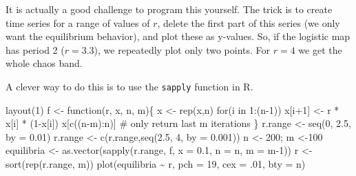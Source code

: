 \documentclass[
  a4paper,
  DIV=11,
  numbers=noendperiod,
  oneside]{scrreprt}
\newenvironment{Shaded}{}{}
\newcommand{\AttributeTok}[1]{\textcolor[rgb]{0.84,0.23,0.29}{#1}}
\newcommand{\CommentTok}[1]{\textcolor[rgb]{0.42,0.45,0.49}{#1}}
\newcommand{\ControlFlowTok}[1]{\textcolor[rgb]{0.84,0.23,0.29}{#1}}
\newcommand{\DecValTok}[1]{\textcolor[rgb]{0.00,0.36,0.77}{#1}}
\newcommand{\FloatTok}[1]{\textcolor[rgb]{0.00,0.36,0.77}{#1}}
\newcommand{\FunctionTok}[1]{\textcolor[rgb]{0.44,0.26,0.76}{#1}}
\newcommand{\NormalTok}[1]{\textcolor[rgb]{0.14,0.16,0.18}{#1}}
\newcommand{\OtherTok}[1]{\textcolor[rgb]{0.44,0.26,0.76}{#1}}
\newcommand{\SpecialCharTok}[1]{\textcolor[rgb]{0.00,0.36,0.77}{#1}}
\newcommand{\StringTok}[1]{\textcolor[rgb]{0.01,0.18,0.38}{#1}}
\begin{document}
It is actually a good challenge to program this yourself. The trick is
to create time series for a range of values of \(r\), delete the first
part of this series (we only want the equilibrium behavior), and plot
these as y-values. So, if the logistic map has period 2 (\(r = 3.3\)),
we repeatedly plot only two points. For \(r = 4\) we get the whole chaos
band.

A clever way to do this is to use the \texttt{sapply} function in R.

\begin{Shaded}
\begin{Highlighting}[]
\FunctionTok{layout}\NormalTok{(}\DecValTok{1}\NormalTok{)}
\NormalTok{f }\OtherTok{\textless{}{-}} \ControlFlowTok{function}\NormalTok{(r, x, n, m)\{}
\NormalTok{  x }\OtherTok{\textless{}{-}} \FunctionTok{rep}\NormalTok{(x,n)}
  \ControlFlowTok{for}\NormalTok{(i }\ControlFlowTok{in} \DecValTok{1}\SpecialCharTok{:}\NormalTok{(n}\DecValTok{{-}1}\NormalTok{)) x[i}\SpecialCharTok{+}\DecValTok{1}\NormalTok{] }\OtherTok{\textless{}{-}}\NormalTok{ r }\SpecialCharTok{*}\NormalTok{ x[i] }\SpecialCharTok{*}\NormalTok{ (}\DecValTok{1}\SpecialCharTok{{-}}\NormalTok{x[i])}
\NormalTok{  x[}\FunctionTok{c}\NormalTok{((n}\SpecialCharTok{{-}}\NormalTok{m)}\SpecialCharTok{:}\NormalTok{n)] }\CommentTok{\# only return last m iterations}
\NormalTok{\}}
\NormalTok{r.range }\OtherTok{\textless{}{-}} \FunctionTok{seq}\NormalTok{(}\DecValTok{0}\NormalTok{, }\FloatTok{2.5}\NormalTok{, }\AttributeTok{by =} \FloatTok{0.01}\NormalTok{) }
\NormalTok{r.range }\OtherTok{\textless{}{-}} \FunctionTok{c}\NormalTok{(r.range,}\FunctionTok{seq}\NormalTok{(}\FloatTok{2.5}\NormalTok{, }\DecValTok{4}\NormalTok{, }\AttributeTok{by =} \FloatTok{0.001}\NormalTok{)) }
\NormalTok{n }\OtherTok{\textless{}{-}} \DecValTok{200}\NormalTok{; m }\OtherTok{\textless{}{-}}\DecValTok{100} 
\NormalTok{equilibria }\OtherTok{\textless{}{-}} \FunctionTok{as.vector}\NormalTok{(}\FunctionTok{sapply}\NormalTok{(r.range, f,  }\AttributeTok{x =} \FloatTok{0.1}\NormalTok{, }\AttributeTok{n =}\NormalTok{ n, }\AttributeTok{m =}\NormalTok{ m}\DecValTok{{-}1}\NormalTok{))}
\NormalTok{r }\OtherTok{\textless{}{-}} \FunctionTok{sort}\NormalTok{(}\FunctionTok{rep}\NormalTok{(r.range, m))}
\FunctionTok{plot}\NormalTok{(equilibria }\SpecialCharTok{\textasciitilde{}}\NormalTok{ r, }\AttributeTok{pch =} \DecValTok{19}\NormalTok{, }\AttributeTok{cex =}\NormalTok{ .}\DecValTok{01}\NormalTok{, }\AttributeTok{bty =} \StringTok{\textquotesingle{}n\textquotesingle{}}\NormalTok{)}
\end{Highlighting}
\end{Shaded}
\end{document}
